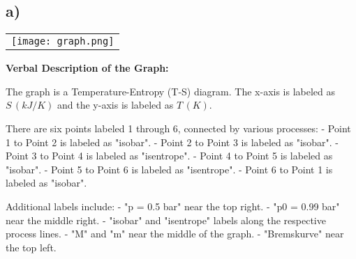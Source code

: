 

\subsection*{a)}

\begin{center}
\begin{tabular}{c}
\texttt{[image: graph.png]}
\end{tabular}
\end{center}

\textbf{Verbal Description of the Graph:}

The graph is a Temperature-Entropy (T-S) diagram. The x-axis is labeled as $S \, (kJ/K)$ and the y-axis is labeled as $T \, (K)$. 

There are six points labeled 1 through 6, connected by various processes:
- Point 1 to Point 2 is labeled as "isobar".
- Point 2 to Point 3 is labeled as "isobar".
- Point 3 to Point 4 is labeled as "isentrope".
- Point 4 to Point 5 is labeled as "isobar".
- Point 5 to Point 6 is labeled as "isentrope".
- Point 6 to Point 1 is labeled as "isobar".

Additional labels include:
- "p = 0.5 bar" near the top right.
- "p0 = 0.99 bar" near the middle right.
- "isobar" and "isentrope" labels along the respective process lines.
- "M" and "m" near the middle of the graph.
- "Bremskurve" near the top left.